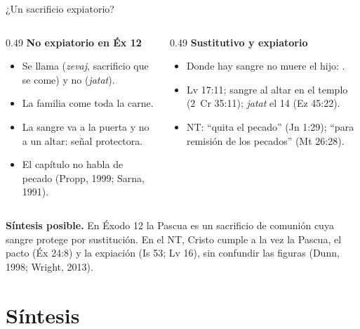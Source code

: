 \begin{frame}{¿Un sacrificio expiatorio?}
\begin{columns}[t,onlytextwidth]
\begin{column}{0.49\textwidth}\scriptsize\RaggedRight
\textbf{\small\textcolor{tierraroja}{No expiatorio en Éx 12}}
\begin{itemize}\scriptsize
\item Se llama  (\emph{zevaj}, sacrificio que se come) y no  (\emph{jatat}).
\item La familia come toda la carne.
\item La sangre va a la puerta y no a un altar: señal protectora.
\item El capítulo no habla de pecado (Propp, 1999; Sarna, 1991).
\end{itemize}
\end{column}
\begin{column}{0.49\textwidth}\scriptsize\RaggedRight
\textbf{\small\textcolor{tierraroja}{Sustitutivo y expiatorio}}
\begin{itemize}\scriptsize
\item Donde hay sangre no muere el hijo: .
\item Lv 17:11; sangre al altar en el templo (2~Cr 35:11); \emph{jatat} el 14 (Ez 45:22).
\item NT: ``quita el pecado'' (Jn 1:29); ``para remisión de los pecados'' (Mt 26:28).
\end{itemize}
\end{column}
\end{columns}
\medskip
\begin{tcolorbox}[colback=papiro,colframe=tierraroja,boxrule=0.8pt,arc=2pt,fontupper=\scriptsize]
\textbf{Síntesis posible.} En Éxodo 12 la Pascua es un sacrificio de comunión cuya sangre protege por sustitución. En el NT, Cristo cumple a la vez la Pascua, el pacto (Éx 24:8) y la expiación (Is 53; Lv 16), sin confundir las figuras (Dunn, 1998; Wright, 2013).
\end{tcolorbox}
\end{frame}

\section{Síntesis}

